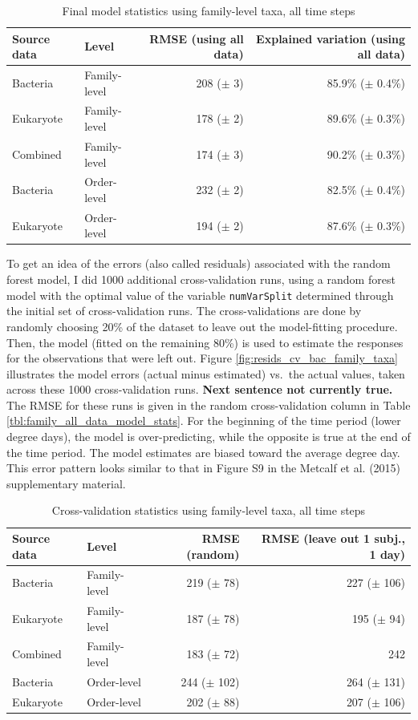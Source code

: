 \documentclass{article}
\begin{document}
\begin{table}
  \centering
\caption{\label{tbl:final_model_stats_all_days}Final model statistics using family-level taxa, all time steps}
\begin{tabular}{llrr}
Source data & Level & RMSE (using all data) & Explained variation (using all data)\\ \hline %
Bacteria  & Family-level & 208 ($\pm$ 3) & 85.9\% ($\pm$ 0.4\%)\\
Eukaryote & Family-level & 178 ($\pm$ 2) & 89.6\% ($\pm$ 0.3\%)\\
Combined  & Family-level & 174 ($\pm$ 3) & 90.2\% ($\pm$ 0.3\%)\\
Bacteria  & Order-level & 232 ($\pm$ 2) & 82.5\% ($\pm$ 0.4\%)\\
Eukaryote & Order-level & 194 ($\pm$ 2) & 87.6\% ($\pm$ 0.3\%)
\end{tabular}
\end{table}

To get an idea of the errors (also called residuals) associated with
the random forest model, I did 1000 additional cross-validation runs,
using a random forest model with the optimal value of the variable
\texttt{numVarSplit} determined through the initial set of
cross-validation runs.  The cross-validations are done by randomly
choosing 20\% of the dataset to leave out the model-fitting procedure.
Then, the model (fitted on the remaining 80\%) is used to estimate the
responses for the observations that were left out.  Figure
\ref{fig:resids_cv_bac_family_taxa} illustrates the model errors
(actual minus estimated) vs.~the actual values, taken across these
1000 cross-validation runs.  \textbf{Next sentence not currently
  true.}  The RMSE for these runs is given in the random
cross-validation column in Table
\ref{tbl:family_all_data_model_stats}.  For the beginning of the time
period (lower degree days), the model is over-predicting, while the
opposite is true at the end of the time period.  The model estimates
are biased toward the average degree day.  This error pattern looks
similar to that in Figure S9 in the Metcalf et al. (2015)
supplementary material.

\begin{table}
  \centering
\caption{\label{tbl:valid_model_stats_all_days}Cross-validation statistics using family-level taxa, all time steps}
\begin{tabular}{llrr}
Source data & Level & RMSE (random) & RMSE (leave out 1 subj., 1 day)\\ \hline
Bacteria  & Family-level & 219 ($\pm$ 78) & 227 ($\pm$ 106)\\
Eukaryote & Family-level & 187 ($\pm$ 78) & 195 ($\pm$ 94)\\
Combined  & Family-level & 183 ($\pm$ 72) & 242\\
Bacteria  & Order-level & 244 ($\pm$ 102) & 264 ($\pm$ 131)\\
Eukaryote & Order-level & 202 ($\pm$ 88) & 207 ($\pm$ 106)
\end{tabular}
\end{table}
\end{document}
